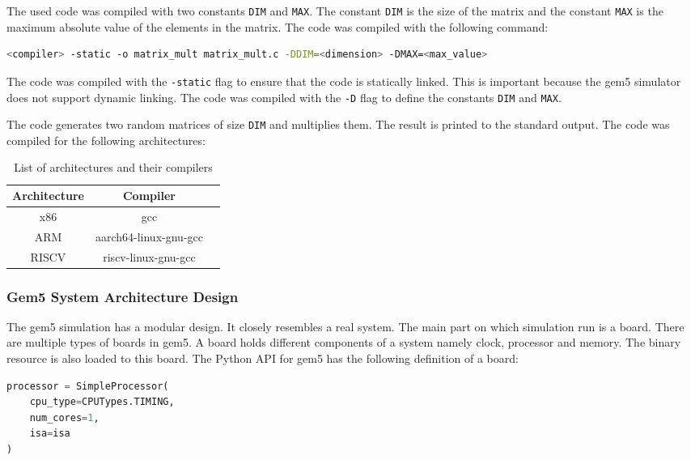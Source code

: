The used code was compiled with two constants \texttt{DIM} and \texttt{MAX}. The constant \texttt{DIM} is the size of the matrix and the constant \texttt{MAX} is the maximum absolute value of the elements in the matrix. The code was compiled with the following command:

\begin{lstlisting}[language=bash , caption={Compilation Command}, label={lst:compilation}]
    <compiler> -static -o matrix_mult matrix_mult.c -DDIM=<dimension> -DMAX=<max_value>
\end{lstlisting}


The code was compiled with the \texttt{-static} flag to ensure that the code is statically linked. This is important because the gem5 simulator does not support dynamic linking. The code was compiled with the \texttt{-D} flag to define the constants \texttt{DIM} and \texttt{MAX}.

The code generates two random matrices of size \texttt{DIM} and multiplies them. The result is printed to the standard output. The code was compiled for the following architectures:

\begin{table}[h!]
	\centering
	\begin{tabular}{|c|c|c|}
		\hline
		\textbf{Architecture} & \textbf{Compiler}     \\
		\hline
		x86                   & gcc                   \\
		ARM                   & aarch64-linux-gnu-gcc \\
		RISCV                 & riscv-linux-gnu-gcc   \\
		\hline
	\end{tabular}
	\vspace{0.2cm}
	\caption{List of architectures and their compilers}
\end{table}

\subsubsection{Gem5 System Architecture Design} The gem5 simulation has a modular design. It closely resembles a real
system. The main part on which simulation run is a board. There are
multiple types of boards in gem5. A board holds different components of
a system namely clock, processor and memory. The binary resource is also
loaded to this board. The Python API for gem5 has the following definition of a board:

\begin{lstlisting}[language=python, caption={Gem5 Processor Definition}, label={lst:gem5_processor}]
processor = SimpleProcessor(
    cpu_type=CPUTypes.TIMING,
    num_cores=1,
    isa=isa
)
\end{lstlisting}

